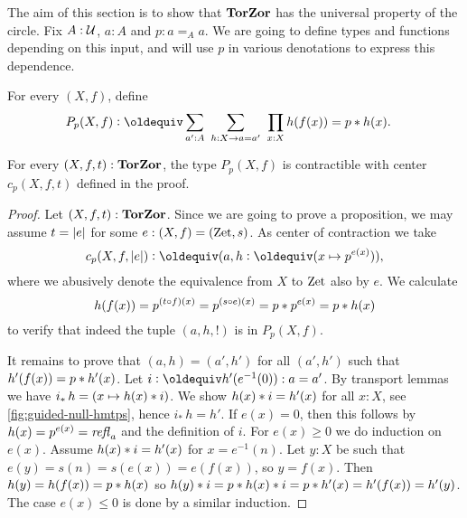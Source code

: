 \documentclass[a4,12pt]{amsart}
\begin{document}
The aim of this section is to show that $\mathbf{TorZor}$ has the
universal property of the circle. Fix $A:\mathcal{U}$, $a:A$ and $p: a=_A a$. 
We are going to define types and
functions depending on this input, and will use $p$ in various
denotations to express this dependence. 

\begin{definition}\label{def:TBN}
For every $(X,f)$, define
\begin{align*}\label{eq:TBD}
P_p(X,f)&\defeq \sum_{a':A}~\sum_{h:X\to a=a'}~\prod_{x:X} h(f(x))=p\ct h(x).
\end{align*}
\end{definition}

\begin{lemma}\label{lem:guided-null-hmtps}
For every $(X,f,t):\mathbf{TorZor}$, the type $P_p(X,f)$ is contractible
with center $c_p(X,f,t)$ defined in the proof.
\end{lemma}
\begin{proof}
  Let $(X,f,t):\mathbf{TorZor}$. Since we are going to prove a proposition, we may assume $t=\lvert e\rvert$ for some $e : (X,f)=(\mathrm{Zet},s)$. As center of
  contraction we take
\[
c_p(X,f,\trunc{e})\defeq (a, h\defeq(x\mapsto p^{e(x)})),
\]
where we 
abusively denote the equivalence from $X$ to $\mathrm{Zet}$ also by $e$.
We calculate 
\[
h(f(x))=p^{(t\circ f)(x)}=p^{(s\circ e)(x)}=p* p^{e(x)}=p* h(x)
\]
to verify that indeed the tuple $(a,h,!)$ is in $P_p(X,f)$.

It remains to prove that $(a,h)=(a',h')$ for all $(a',h')$ such that
$h'(f(x))=p* h'(x)$. Let $i\defeq h'(e^{-1}(0)): a=a'$.
By transport lemmas we have $i_*\, h = (x\mapsto h(x)* i)$.
We show $h(x)* i= h'(x)$ for all $x:X$, 
see \cref{fig:guided-null-hmtps}, hence $i_*\, h = h'$.
If $e(x)=0$, then this follows by $h(x)=p^{e(x)}=\mathop{{\it refl}_{a}}$ and the
definition of $i$. For $e(x)\geq 0$ we do induction on $e(x)$. 
Assume $h(x)* i= h'(x)$ for $x=e^{-1}(n)$.
Let $y:X$ be such that $e(y)=s(n)=s(e(x))=e(f(x))$, so $y=f(x)$.
Then $h(y) = h(f(x)) = p * h(x)$ so 
$h(y)* i= p * h(x)* i = p* h'(x) = h'(f(x)) = h'(y)$.
The case $e(x)\leq 0$ is done by a similar induction.
\end{proof}
\end{document}
